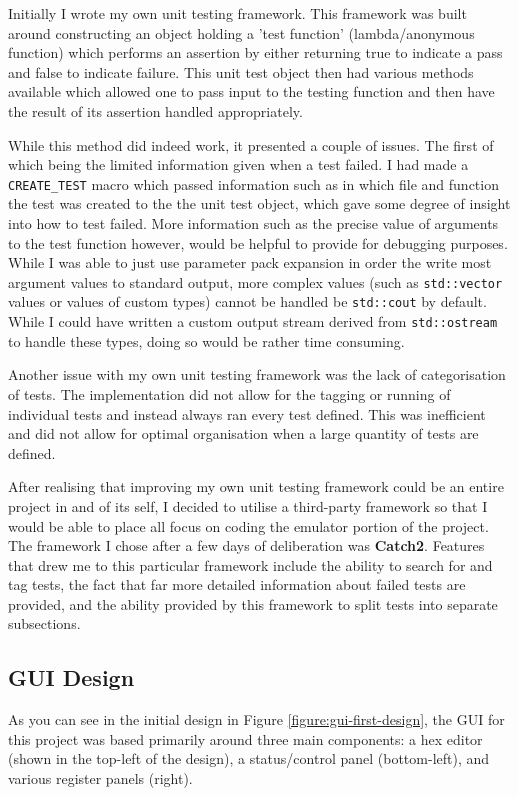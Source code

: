     Initially I wrote my own unit testing framework. This framework was built around constructing an object holding a 'test function' (lambda/anonymous function) which performs an assertion by either returning true to indicate a pass and false to indicate failure. This unit test object then had various methods available which allowed one to pass input to the testing function and then have the result of its assertion handled appropriately.

    While this method did indeed work, it presented a couple of issues. The first of which being the limited information given when a test failed. I had made a \texttt{CREATE\_TEST} macro which passed information such as in which file and function the test was created to the the unit test object, which gave some degree of insight into how to test failed. More information such as the precise value of arguments to the test function however, would be helpful to provide for debugging purposes. While I was able to just use parameter pack expansion in order the write most argument values to standard output, more complex values (such as \texttt{std::vector} values or values of custom types) cannot be handled be \texttt{std::cout} by default. While I could have written a custom output stream derived from \texttt{std::ostream} to handle these types, doing so would be rather time consuming.

    Another issue with my own unit testing framework was the lack of categorisation of tests. The implementation did not allow for the tagging or running of individual tests and instead always ran every test defined. This was inefficient and did not allow for optimal organisation when a large quantity of tests are defined.

    After realising that improving my own unit testing framework could be an entire project in and of its self, I decided to utilise a third-party framework so that I would be able to place all focus on coding the emulator portion of the project. The framework I chose after a few days of deliberation was \textbf{Catch2}. Features that drew me to this particular framework include the ability to search for and tag tests, the fact that far more detailed information about failed tests are provided, and the ability provided by this framework to split tests into separate subsections.

\subsection{GUI Design}
    As you can see in the initial design in Figure \ref{figure:gui-first-design}, the GUI for this project was based primarily around three main components: a hex editor (shown in the top-left of the design), a status/control panel (bottom-left), and various register panels (right).

